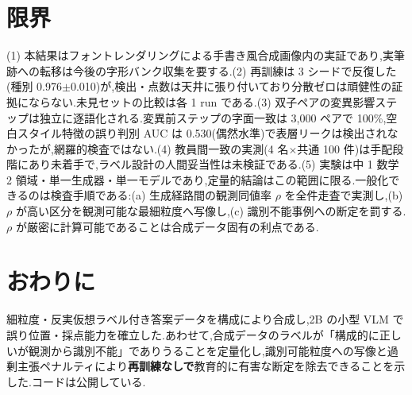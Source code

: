 \documentclass[a4paper,twocolumn,10pt]{jarticle}
\begin{document}
\section{限界}
(1) 本結果はフォントレンダリングによる手書き風合成画像内の実証であり,実筆跡への転移は今後の字形バンク収集を要する.(2) 再訓練は 3 シードで反復した(種別 0.976$\pm$0.010)が,検出・点数は天井に張り付いており分散ゼロは頑健性の証拠にならない.未見セットの比較は各 1 run である.(3) 双子ペアの変異影響ステップは独立に逐語化される.変異前ステップの字面一致は 3,000 ペアで 100\%,空白スタイル特徴の誤り判別 AUC は 0.530(偶然水準)で表層リークは検出されなかったが,網羅的検査ではない.(4) 教員間一致の実測(4 名$\times$共通 100 件)は手配段階にあり未着手で,ラベル設計の人間妥当性は未検証である.(5) 実験は中 1 数学 2 領域・単一生成器・単一モデルであり,定量的結論はこの範囲に限る.一般化できるのは検査手順である:(a) 生成経路間の観測同値率 $\rho$ を全件走査で実測し,(b) $\rho$ が高い区分を観測可能な最細粒度へ写像し,(c) 識別不能事例への断定を罰する.$\rho$ が厳密に計算可能であることは合成データ固有の利点である.

\section{おわりに}
細粒度・反実仮想ラベル付き答案データを構成により合成し,2B の小型 VLM で誤り位置・採点能力を確立した.あわせて,合成データのラベルが「構成的に正しいが観測から識別不能」でありうることを定量化し,識別可能粒度への写像と過剰主張ペナルティにより\textbf{再訓練なしで}教育的に有害な断定を除去できることを示した.コードは公開している.
\end{document}
